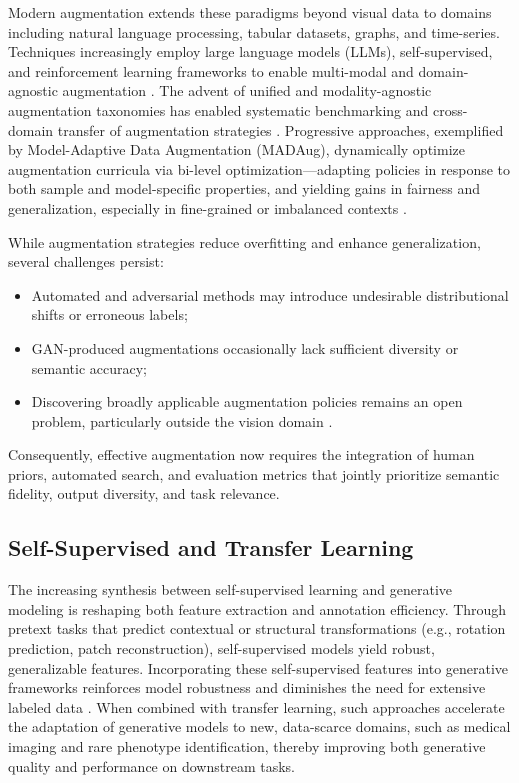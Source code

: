 \documentclass[sigconf]{acmart}
\begin{document}
Modern augmentation extends these paradigms beyond visual data to domains including natural language processing, tabular datasets, graphs, and time-series. Techniques increasingly employ large language models (LLMs), self-supervised, and reinforcement learning frameworks to enable multi-modal and domain-agnostic augmentation \cite{ref1,ref2,ref3,ref5,ref6,ref10,ref12,ref13,ref14,ref15,ref16,ref18,ref21,ref22,ref23,ref24,ref25,ref26,ref29,ref30,ref32,ref60,ref62,ref64,ref65,ref70,ref83}. The advent of unified and modality-agnostic augmentation taxonomies has enabled systematic benchmarking and cross-domain transfer of augmentation strategies \cite{ref60,ref62}. Progressive approaches, exemplified by Model-Adaptive Data Augmentation (MADAug), dynamically optimize augmentation curricula via bi-level optimization---adapting policies in response to both sample and model-specific properties, and yielding gains in fairness and generalization, especially in fine-grained or imbalanced contexts \cite{ref66}.

While augmentation strategies reduce overfitting and enhance generalization, several challenges persist:
\begin{itemize}
    \item Automated and adversarial methods may introduce undesirable distributional shifts or erroneous labels;
    \item GAN-produced augmentations occasionally lack sufficient diversity or semantic accuracy;
    \item Discovering broadly applicable augmentation policies remains an open problem, particularly outside the vision domain \cite{ref62,ref66,ref85}.
\end{itemize}
Consequently, effective augmentation now requires the integration of human priors, automated search, and evaluation metrics that jointly prioritize semantic fidelity, output diversity, and task relevance.

\subsection{Self-Supervised and Transfer Learning}

The increasing synthesis between self-supervised learning and generative modeling is reshaping both feature extraction and annotation efficiency. Through pretext tasks that predict contextual or structural transformations (e.g., rotation prediction, patch reconstruction), self-supervised models yield robust, generalizable features. Incorporating these self-supervised features into generative frameworks reinforces model robustness and diminishes the need for extensive labeled data \cite{ref79}. When combined with transfer learning, such approaches accelerate the adaptation of generative models to new, data-scarce domains, such as medical imaging and rare phenotype identification, thereby improving both generative quality and performance on downstream tasks.
\end{document}
